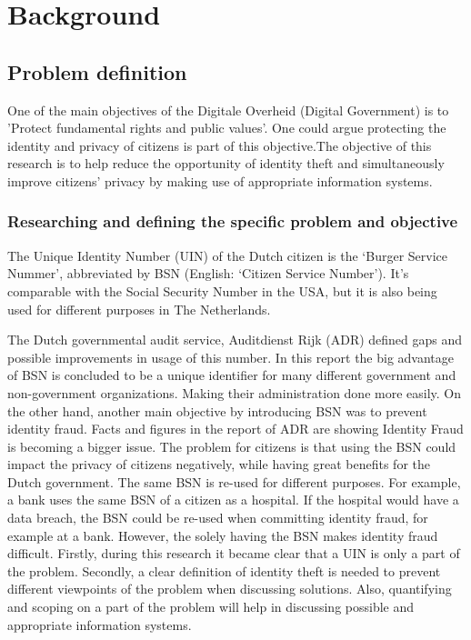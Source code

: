 \chapter{Background}\label{s:background}
\section{Problem definition}
One of the main objectives of the Digitale Overheid (Digital Government) is to 'Protect fundamental rights and public values'\cite{DO_agenda}. One could argue protecting the identity and privacy of citizens is part of this objective.The objective of this research is to help reduce the opportunity of identity theft and simultaneously improve citizens’ privacy by making use of appropriate information systems.


\subsection{Researching and defining the specific problem and objective}
The Unique Identity Number (UIN) of the Dutch citizen is the ‘Burger Service Nummer’, abbreviated by BSN (English: ‘Citizen Service Number’). It’s comparable with the Social Security Number in the USA, but it is also being used for different purposes in The Netherlands. \par
The Dutch governmental audit service, Auditdienst Rijk (ADR) defined gaps and possible improvements in usage of this number\cite{ADR}. In this report the big advantage of BSN is concluded to be a unique identifier for many different government and non-government organizations. Making their administration done more easily. On the other hand, another main objective by introducing BSN was to prevent identity fraud. Facts and figures in the report of ADR are showing Identity Fraud is becoming a bigger issue. The problem for citizens is that using the BSN could impact the privacy of citizens negatively, while having great benefits for the Dutch government. The same BSN is re-used for different purposes. For example, a bank uses the same BSN of a citizen as a hospital. If the hospital would have a data breach, the BSN could be re-used when committing identity fraud, for example at a bank. However, the solely having the BSN makes identity fraud difficult. 
Firstly, during this research it became clear that a UIN is only a part of the problem. Secondly, a clear definition of identity theft is needed to prevent different viewpoints of the problem when discussing solutions. Also, quantifying and scoping on a part of the problem will help in discussing possible and appropriate information systems.
\par

